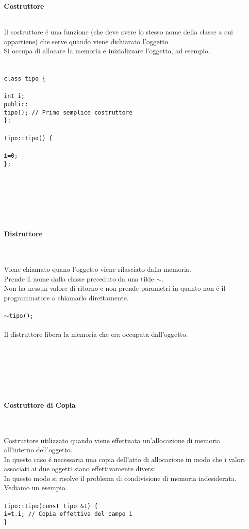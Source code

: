 \documentclass{article}
\newcommand\tab[1][1cm]{\hspace*{#1}}
\newcommand\TILDE{$\sim$}
\begin{document}
\textcolor{grigio}{\begin{large}\textbf{Costruttore}\\ \end{large}
\\Il costruttore \'e una funzione (che deve avere lo stesso nome della classe a cui appartiene) che serve quando viene dichiarato l'oggetto. \\Si occupa di allocare la memoria e inizializzare l'oggetto, ad esempio. \\ \\ \\ \tt{class tipo \{ \\ \\ \tab int i; \\ \tab public: \\ \tab \tab tipo(); // Primo semplice costruttore \\ \}; \\ \\ tipo::tipo() \{ \\ \\ \tab i=0; \\ \};}} 
\\ \\ \\ \\ \\
\textcolor{grigio}{\begin{large}\textbf{Distruttore}\end{large}
\\ \\Viene chiamato quano l'oggetto viene rilasciato dalla memoria. \\Prende il nome dalla classe preceduto da una tilde \TILDE .\\ Non ha nessun valore di ritorno e non prende parametri in quanto non \'e il programmatore a chiamarlo direttamente. \\ \\ \texttt{\TILDE tipo();} \\ \\Il distruttore libera la memoria che era occupata dall'oggetto.} 
\\ \\ \\ \\ \\
\textcolor{grigio}{\begin{large}\textbf{Costruttore di Copia}\end{large}
\\ \\Costruttore utilizzato quando viene effettuata un'allocazione di memoria all'interno dell'oggetto. \\In questo caso \'e necessaria una copia dell'atto di allocazione in modo che i valori associati ai due oggetti siano effettivamente diversi.\\ In questo modo si risolve il problema di condivisione di memoria indesiderata. \\Vediamo un esempio.\\ \\ \tt{tipo::tipo(const tipo \&t) \{ \\ \tab i=t.i; // Copia effettiva del campo i \\ \} }} 
\end{document}
